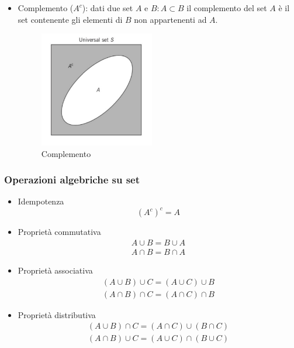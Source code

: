 \begin{itemize}
{                }
                \item {Complemento ($A^c$): dati due set $A$ e $B:A\subset B$ il complemento del set $A$ è il set contenente gli elementi di $B$ non appartenenti ad $A$.
                \begin{figure}[H]
                    \centering
                    \includegraphics[width = 5cm]{media/Insieme_Complementare.png}
                    \caption{Complemento}
                \end{figure}
                }
            \end{itemize}
        \subsubsection{Operazioni algebriche su set}
            \begin{itemize}
                \item {Idempotenza
                    \[
                        \left(A^c\right)^c = A
                    \]
                }
                \item {Proprietà commutativa
                    \begin{gather}
                        A\cup B = B\cup A \nonumber \\
                        A\cap B = B\cap A \nonumber
                    \end{gather}
                }
                \item {Proprietà associativa
                    \begin{gather}
                        (A\cup B) \cup C= (A\cup C)\cup B \nonumber \\
                        (A\cap B) \cap C= (A\cap C)\cap B \nonumber                        
                    \end{gather}
                }
                \item {Proprietà distributiva
                    \begin{gather}
                        (A\cup B) \cap C= (A\cap C)\cup (B \cap C) \nonumber \\
                        (A\cap B) \cup C= (A\cup C)\cap (B \cup C) \nonumber                        
                    \end{gather}
                }
            \end{itemize}

